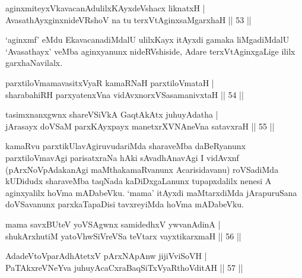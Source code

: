 
\begin{shl}
aginxmiteyxVkavacanAdulilxKAyxdeVshacx liknatxH | \\
AvasathAyxginxnideVRshoV na tu terxVtAginxsaMgarxhaH \hfill|| 53 || 
\end{shl}

\begin{artha}
`aginxmf' eMdu EkavacanadiMdalU ulilxKayx itAyxdi gamaka liMgadiMdalU `Avasathayx' veMba aginxyanunx nideRVshiside, Adare terxVtAginxgaLige ililx garxhaNavilalx.
\end{artha}


\begin{shl}
parxtiloVmamavasitxVyaR kamaRNaH parxtiloVmataH | \\
sharabahiRH parxyatenxVna vidAvxnorxVSasamanivxtaH \hfill|| 54 || 
\end{shl}

\begin{shl}
tasimxnanxgwnx shareVSiVkA GaqtAkAtx juhuyAdatha | \\
jArasayx doVSaM parxKAyxpayx manetxrXVNAneVna satavxraH \hfill|| 55 || 
\end{shl}

\begin{artha}
kamaRvu parxtikUlavAgiruvudariMda sharaveMba daBeRyanunx parxtiloVmavAgi parisatxraNa hAki sAvadhAnavAgi I vidAvxnf (pArxNoVpAdakanAgi maMthakamaRvanunx Acarisidavanu) roVSadiMda kUDidudx sharaveMba taqNada kaDiDxgaLanunx tupapxdalilx nenesi A aginxyalilx hoVma mADabeVku. `mama' itAyxdi maMtarxdiMda jArapuruSana doVSavanunx parxkaTapaDisi tavxreyiMda hoVma mADabeVku.
\end{artha}


\begin{shl}
mama savxBUteV yoVSAgwnx samidedhxV ywvanAdinA | \\
shukArxhutiM yatoV\s hwSiVreVSa teV\s tarx vayxtikarxmaH \hfill|| 56 || 
\end{shl}

\begin{shl}
AdadeV\s toV\s parAdhAtetxV pArxNApAnw jijiVviSoVH | \\
PaTAkxreVNeYva juhuyAcaCxraBaqSiTxVyaRthoVditAH \hfill|| 57 || 
\end{shl}

